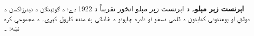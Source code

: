\textbf{اېرنست زېر مېلو۔} د اېرنست زېر مېلو انځور تقريباً د 1922 دے؛ د ګوټېنګن د نيدرزاكسن د دولتي او پوهنتوني کتابتون د قلمي نسخو او نادره چاپونو د څانګې په مننه کارول کېږي۔ د مجموعې کره نښه: ۔
